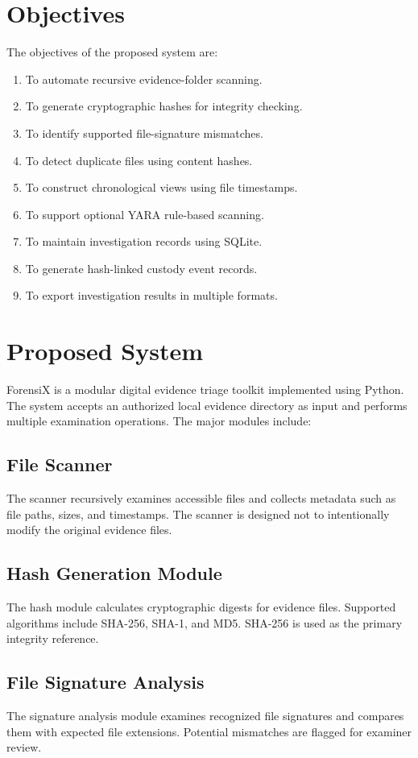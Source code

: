 \documentclass[conference]{IEEEtran}
\begin{document}
\section{Objectives}
The objectives of the proposed system are:
\begin{enumerate}
    \item To automate recursive evidence-folder scanning.
    \item To generate cryptographic hashes for integrity checking.
    \item To identify supported file-signature mismatches.
    \item To detect duplicate files using content hashes.
    \item To construct chronological views using file timestamps.
    \item To support optional YARA rule-based scanning.
    \item To maintain investigation records using SQLite.
    \item To generate hash-linked custody event records.
    \item To export investigation results in multiple formats.
\end{enumerate}

\section{Proposed System}
ForensiX is a modular digital evidence triage toolkit implemented using Python. The system accepts an authorized local evidence directory as input and performs multiple examination operations. The major modules include:

\subsection{File Scanner}
The scanner recursively examines accessible files and collects metadata such as file paths, sizes, and timestamps. The scanner is designed not to intentionally modify the original evidence files.

\subsection{Hash Generation Module}
The hash module calculates cryptographic digests for evidence files. Supported algorithms include SHA-256, SHA-1, and MD5. SHA-256 is used as the primary integrity reference.

\subsection{File Signature Analysis}
The signature analysis module examines recognized file signatures and compares them with expected file extensions. Potential mismatches are flagged for examiner review.
\end{document}
